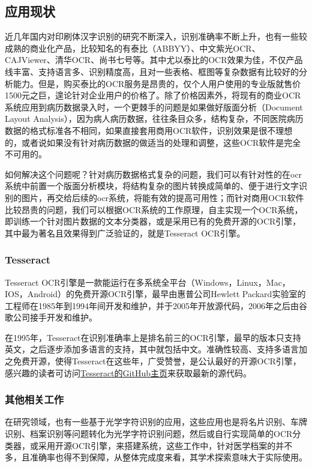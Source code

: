 \subsection{应用现状}
近几年国内对印刷体汉字识别的研究不断深入，识别准确率不断上升，也有一些较成熟的商业化产品，比较知名的有泰比（ABBYY）、中文紫光OCR、CAJViewer、清华OCR、尚书七号等。其中尤以泰比的OCR效果为佳，不仅产品线丰富、支持语言多、识别精度高，且对一些表格、框图等复杂数据有比较好的分析能力。但是，购买泰比的OCR服务是昂贵的，仅个人用户使用的专业版就售价1500元之巨，遑论针对企业用户的价格了。除了价格因素外，将现有的商业OCR系统应用到病历数据录入时，一个更棘手的问题是如果做好版面分析（Document Layout Analysis），因为病人病历数据，往往条目众多，结构复杂，不同医院病历数据的格式标准各不相同，如果直接套用商用OCR软件，识别效果是很不理想的，或者说如果没有针对病历数据的做适当的处理和调整，这些OCR软件是完全不可用的。

如何解决这个问题呢？针对病历数据格式复杂的问题，我们可以有针对性的在ocr系统中前置一个版面分析模块，将结构复杂的图片转换成简单的、便于进行文字识别的图片，再交给后续的ocr系统，将能有效的提高可用性；而针对商用OCR软件比较昂贵的问题，我们可以根据OCR系统的工作原理，自主实现一个OCR系统，即训练一个针对图片数据的文本分类器，或是采用已有的免费开源的OCR引擎，其中最为著名且效果得到广泛验证的，就是Tesseract OCR引擎。

\subsubsection*{Tesseract}
Tesseract OCR引擎是一款能运行在多系统全平台（Windows，Linux，Mac，IOS，Android）的免费开源OCR引擎，最早由惠普公司Hewlett Packard实验室的工程师在1985年到1994年间开发和维护，并于2005年开放源代码，2006年之后由谷歌公司接手开发和维护\citep{wiki:Tesseract}。

在1995年，Tesseract在识别准确率上是排名前三的OCR引擎，最早的版本只支持英文，之后逐步添加多语言的支持，其中就包括中文。准确性较高、支持多语言加之免费开源，使得Tesseract在这些年，广受赞誉，是公认最好的开源OCR引擎，感兴趣的读者可访问\href{https://github.com/tesseract-ocr/tesseract}{Tesseract的GitHub主页}来获取最新的源代码。

\subsubsection*{其他相关工作}
在研究领域，也有一些基于光学字符识别的应用\citep{SongWan, HongfengLi, TikunHu}，这些应用也是将名片识别、车牌识别、档案识别等问题转化为光学字符识别问题，然后或自行实现简单的OCR分类器，或采用开源OCR引擎，来搭建系统，这些工作中，针对医学档案的并不多\citep{MinghuaXiang}，且准确率也得不到保障，从整体完成度来看，其学术探索意味大于实际使用。

